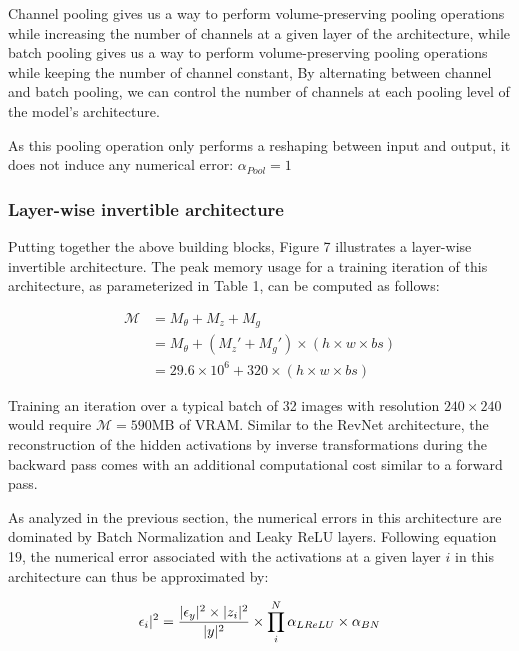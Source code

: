 \documentclass[twocolumn]{bmcart}
\begin{document}
Channel pooling gives us a way to perform volume-preserving pooling operations
while increasing the number of channels at a given layer of the architecture,
while batch pooling gives us a way to perform volume-preserving pooling operations
while keeping the number of channel constant,
By alternating between channel and batch pooling, we can control the number
of channels at each pooling level of the model's architecture.

As this pooling operation only performs a reshaping between input and output,
it does not induce any numerical error: $\alpha_{Pool}=1$

\subsubsection{Layer-wise invertible architecture}

Putting together the above building blocks, Figure 7 illustrates a layer-wise invertible architecture.
The peak memory usage for a training iteration of this architecture, as parameterized in Table 1, can be computed as follows:

\begin{subequations}
\begin{align}
\mathcal{M} &= M_{\theta} + M_{z} + M_{g} \\
            &= M_{\theta} + (M_z' + M_{g}') \times (h \times w \times bs) \\
            &= 29.6 \times 10^6 + 320 \times (h \times w \times bs)
\end{align}
\end{subequations}

Training an iteration over a typical batch of 32 images with resolution $240 \times 240$ would require $\mathcal{M}=590$MB of VRAM.
Similar to the RevNet architecture, the reconstruction of the hidden activations by inverse transformations
during the backward pass comes with an additional computational cost similar to a forward pass.

As analyzed in the previous section, the numerical errors in this architecture are dominated by Batch Normalization and Leaky ReLU layers.
Following equation 19, the numerical error associated with the activations at a given layer $i$ in this architecture can thus be approximated by:

\begin{equation}
\epsilon_i |^2 =  \frac{| \epsilon_y |^2 \times | z_i |^2}{| y |^2} \times \prod_i^{N} \alpha_{LReLU} \times \alpha_{BN} \\
\end{equation}
\end{document}
